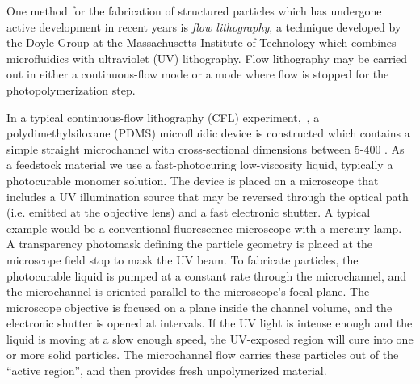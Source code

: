 One method for the fabrication of structured particles which has undergone active development in recent years is 
\textit{flow lithography}, a technique developed by the Doyle Group at 
the Massachusetts Institute of Technology which combines microfluidics with 
ultraviolet (UV) lithography.  Flow lithography may be carried out in either a continuous-flow mode or a 
mode where flow is stopped for the photopolymerization step.


In a typical continuous-flow lithography (CFL) experiment,~\cite{dendukuri-cfl},
a polydimethylsiloxane (PDMS) microfluidic device is constructed
which contains a simple straight microchannel with cross-sectional dimensions between 5-400 \microns. As a feedstock
material we use a fast-photocuring low-viscosity liquid, typically a photocurable monomer solution. The device is 
placed on a microscope that includes a UV illumination source that may be reversed through the optical path (i.e.
emitted at the objective lens) and a fast electronic shutter. A typical example would be a conventional 
fluorescence microscope with a mercury lamp.  A
transparency photomask defining the particle geometry is placed at the microscope
field stop to mask the UV beam.
To fabricate particles, the photocurable liquid is pumped 
at a constant rate through the microchannel, and the microchannel is oriented
parallel to the microscope's focal plane. The microscope objective is focused on a plane inside the channel
volume, and the
electronic shutter is opened at intervals. If the UV light is intense enough and the liquid is moving at a slow enough speed,
the UV-exposed region will cure into one or more solid particles.  
The microchannel flow carries these particles out of the ``active 
region'', and then provides fresh unpolymerized material.



